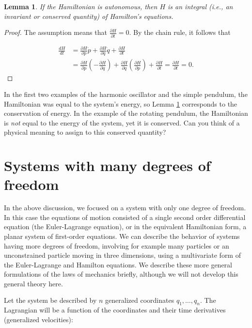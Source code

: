 \documentclass[11pt]{report}
\theoremstyle{plain}
\newtheorem{lem}[thm]{Lemma}
\theoremstyle{definition}
\begin{document}
\begin{lem}
\label{lem:hamiltonian-conserved}
If the Hamiltonian is autonomous, then $H$ is an
integral (i.e., an invariant or conserved quantity) of
Hamilton's equations.
\end{lem}

\begin{proof}
The assumption means that
$\frac{\partial H}{\partial t} = 0$. By the chain
rule, it follows that

\begin{align*}
\frac{dH}{dt} &= \frac{\partial H}{\partial p} \dot{p}+\frac{\partial H}{\partial q} \dot{q} + \frac{\partial H}{\partial t} \\
&= \frac{\partial H}{\partial p}\left(-\frac{\partial H}{\partial q}\right)+\frac{\partial H}{\partial q}\left(\frac{\partial H}{\partial p}\right)+\frac{\partial H}{\partial t}
= \frac{\partial H}{\partial t} = 0.
\end{align*}

\end{proof}

In the first two examples of the harmonic oscillator
and the simple pendulum, the Hamiltonian was equal to
the system's energy, so Lemma
\ref{lem:hamiltonian-conserved} corresponds to the
conservation of energy. In the example of the rotating
pendulum, the Hamiltonian is \emph{not} equal to the energy
of the system, yet it is conserved. Can you think of a
physical meaning to assign to this conserved quantity?

\section{Systems with many degrees of freedom}
In the above discussion, we focused on a system with
only one degree of freedom. In this case the equations
of motion consisted of a single second order
differential equation (the Euler-Lagrange equation),
or in the equivalent Hamiltonian form, a planar system
of first-order equations. We can describe the behavior
of systems having more degrees of freedom, involving
for example many particles or an unconstrained
particle moving in three dimensions, using a
multivariate form of the Euler-Lagrange and Hamilton
equations. We describe these more general formulations
of the laws of mechanics briefly, although we will not
develop this general theory here.

Let the system be described by $n$ generalized
coordinates $q_1, \ldots, q_n$. The Lagrangian will
be a function of the coordinates and their time
derivatives (generalized velocities):
\end{document}
